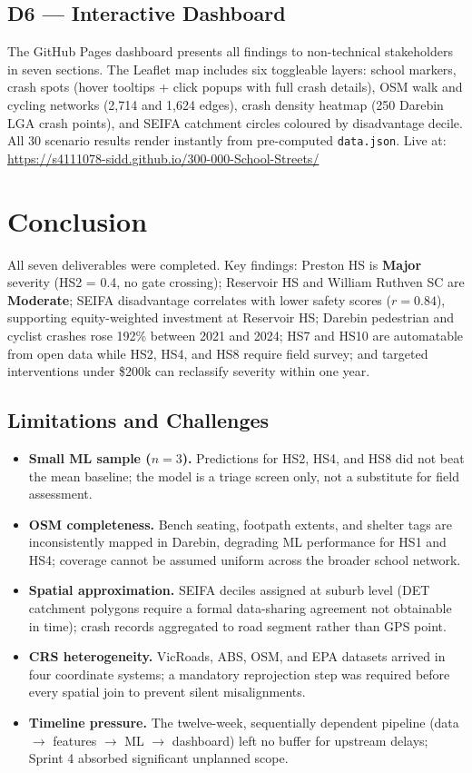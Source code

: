 \documentclass[11pt,a4paper]{article}
\begin{document}
\subsection{D6 — Interactive Dashboard}
The GitHub Pages dashboard presents all findings to non-technical stakeholders in seven sections. The Leaflet map includes six toggleable layers: school markers, crash spots (hover tooltips + click popups with full crash details), OSM walk and cycling networks (2,714 and 1,624 edges), crash density heatmap (250 Darebin LGA crash points), and SEIFA catchment circles coloured by disadvantage decile. All 30 scenario results render instantly from pre-computed \texttt{data.json}. Live at: \url{https://s4111078-sidd.github.io/300-000-School-Streets/}

\section{Conclusion}
All seven deliverables were completed. Key findings: Preston HS is \textbf{Major} severity (HS2 = 0.4, no gate crossing); Reservoir HS and William Ruthven SC are \textbf{Moderate}; SEIFA disadvantage correlates with lower safety scores ($r = 0.84$), supporting equity-weighted investment at Reservoir HS; Darebin pedestrian and cyclist crashes rose 192\% between 2021 and 2024; HS7 and HS10 are automatable from open data while HS2, HS4, and HS8 require field survey; and targeted interventions under \$200k can reclassify severity within one year.

\subsection{Limitations and Challenges}
\begin{itemize}[topsep=2pt,itemsep=1pt]
  \item \textbf{Small ML sample ($n=3$).} Predictions for HS2, HS4, and HS8 did not beat the mean baseline; the model is a triage screen only, not a substitute for field assessment.
  \item \textbf{OSM completeness.} Bench seating, footpath extents, and shelter tags are inconsistently mapped in Darebin, degrading ML performance for HS1 and HS4; coverage cannot be assumed uniform across the broader school network.
  \item \textbf{Spatial approximation.} SEIFA deciles assigned at suburb level (DET catchment polygons require a formal data-sharing agreement not obtainable in time); crash records aggregated to road segment rather than GPS point.
  \item \textbf{CRS heterogeneity.} VicRoads, ABS, OSM, and EPA datasets arrived in four coordinate systems; a mandatory reprojection step was required before every spatial join to prevent silent misalignments.
  \item \textbf{Timeline pressure.} The twelve-week, sequentially dependent pipeline (data $\to$ features $\to$ ML $\to$ dashboard) left no buffer for upstream delays; Sprint 4 absorbed significant unplanned scope.
\end{itemize}
\end{document}
